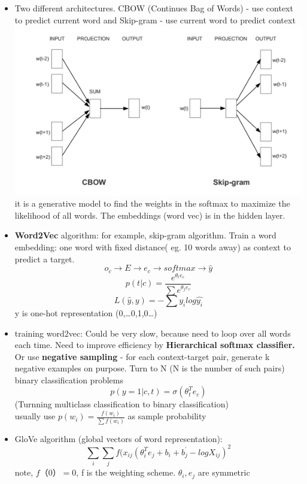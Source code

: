 \documentclass[11pt, openany]{book}              %
\begin{document}
\begin{itemize}
	\item Two different architectures. CBOW (Continues Bag of Words) - use context to predict current word and Skip-gram - use current word to predict context
	\includegraphics[width=15cm]{CBOW-SkipGram.png}
	 it is a generative model to find the weights in the softmax to maximize the likelihood of all words. The embeddings (word vec) is in the hidden layer.
	\item \textbf{Word2Vec} algorithm: for example, skip-gram algorithm. Train a word embedding: one word with fixed distance( eg. 10 words away) as context to predict a target. 
		$$ o_c \rightarrow E \rightarrow e_c \rightarrow softmax \rightarrow \hat{y}$$
		$$p(t|c) = \frac{e^{\theta_t e_c}}{\sum e^{\theta_j e_c}}$$
		$$L(\hat{y},y )= - \sum y_i log \hat{y_i}$$
		y is one-hot representation (0,…0,1,0…)
	\item training word2vec: Could be very slow, because need to loop over all words each time. Need to improve efficiency by \textbf{Hierarchical softmax classifier.} Or use \textbf{negative sampling} - for each context-target pair, generate k negative examples on purpose. Turn to N (N is the number of such pairs) binary classification problems 
		$$p(y = 1 | c, t ) = \sigma( \theta_t^T e_c)$$
		(Turnning multiclass classification to binary classification)\\ 
		usually use $p(w_i) = \frac{f(w_i)}{\sum f (w_i)}$ as sample probability 
	\item GloVe algorithm (global vectors of word representation):
		$$\sum_i \sum_j f(x_{ij} (\theta_i ^ T e_j + b_i + b_j^’ - log X_{ij})^2$$ note, $f（0）= 0$, f is the weighting scheme. $\theta_i, e_j$ are symmetric
\end{itemize}
\end{document}
